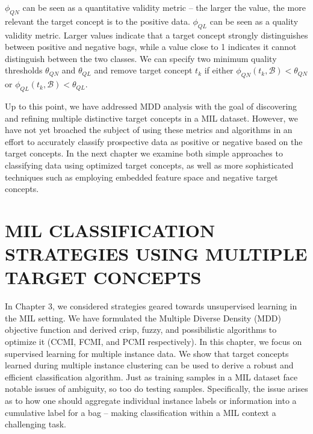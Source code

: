 \documentclass[12pt,dvips]{report}
\numberwithin{equation}{section}
\begin{document}
$\phi_{QN}$ can be seen as a quantitative validity metric -- the larger the value, the more relevant the target concept is to the positive data. $\phi_{QL}$ can be seen as a quality validity metric.  Larger values indicate that a target concept strongly distinguishes between positive and negative bags, while a value close to 1 indicates it cannot distinguish between the two classes.  We can specify two minimum quality thresholds $\theta_{QN}$ and $\theta_{QL}$ and remove target concept $t_k$ if either $\phi_{QN}(t_k,\mathcal{B})<\theta_{QN}$ or $\phi_{QL}(t_k,\mathcal{B})<\theta_{QL}$.


Up to this point, we have addressed MDD analysis with the goal of discovering and refining multiple distinctive target concepts in a MIL dataset. However, we have not yet broached the subject of using these metrics and algorithms in an effort to accurately classify prospective data as positive or negative based on the target concepts.  In the next chapter we examine both simple approaches to classifying data using optimized target concepts, as well as more sophisticated techniques such as employing embedded feature space and negative target concepts.



\chapter{MIL CLASSIFICATION STRATEGIES USING MULTIPLE TARGET CONCEPTS} \label{chapter:MDD_Classification}

In Chapter 3, we considered strategies geared towards unsupervised learning in the MIL setting.  We have formulated the Multiple Diverse Density (MDD) objective function and derived crisp, fuzzy, and possibilistic algorithms to optimize it (CCMI, FCMI, and PCMI respectively).  In this chapter, we focus on supervised learning for multiple instance data.  We show that target concepts learned during multiple instance clustering can be used to derive a robust and efficient classification algorithm.  Just as training samples in a MIL dataset face notable issues of ambiguity, so too do testing samples.  Specifically, the issue arises as to how one should aggregate individual instance labels or information into a cumulative label for a bag -- making classification within a MIL context a challenging task.  
\end{document}
